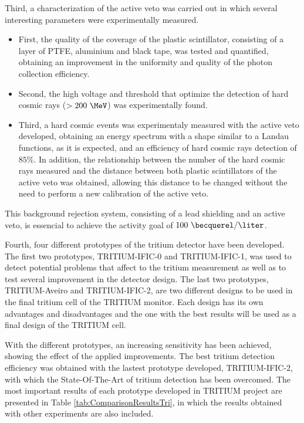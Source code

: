 Third, a characterization of the active veto was carried out in which several interesting parameters were experimentally measured.

\begin{itemize}

\item{} First, the quality of the coverage of the plastic scintillator, consisting of a layer of PTFE, aluminium and black tape, was tested and quantified, obtaining an improvement in the uniformity and quality of the photon collection efficiency.

\item{} Second, the high voltage and threshold that optimize the detection of hard cosmic rays ($>200~\MeV$) was experimentally found.

\item{} Third, a hard cosmic events was experimentaly measured with the active veto developed, obtaining an energy spectrum with a shape similar to a Landau functions, as it is expected, and an efficiency of hard cosmic rays detection of $85\%$. In addition, the relationship between the number of the hard cosmic rays measured and the distance between both plastic scintillators of the active veto was obtained, allowing this distance to be changed without the need to perform a new calibration of the active veto.

\end{itemize}

This background rejection system, consisting of a lead shielding and an active veto, is essencial to achieve the activity goal of $100~\becquerel/\liter$.

Fourth, four different prototypes of the tritium detector have been developed. The first two prototypes, TRITIUM-IFIC-0 and TRITIUM-IFIC-1, was used to detect potential problems that affect to the tritium measurement as well as to test several improvement in the detector design. The last two prototypes, TRITIUM-Aveiro and TRITIUM-IFIC-2, are two different designs to be used in the final tritium cell of the TRITIUM monitor. Each design has its own advantages and disadvantages and the one with the best results will be used as a final design of the TRITIUM cell.

With the different prototypes, an increasing sensitivity has been achieved, showing the effect of the applied improvements. The best tritium detection efficiency was obtained with the lastest prototype developed, TRITIUM-IFIC-2, with which the State-Of-The-Art of tritium detection has been overcomed. The most important results of each prototype developed in TRITIUM project are presented in Table \ref{tab:ComparisonResultsTri}, in which the results obtained with other experiments are also included.

